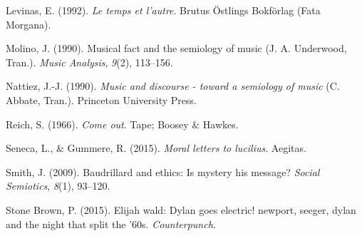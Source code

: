 \documentclass[11pt]{article}
\begin{document}
\begin{hangparas}{1.5em}{1}
\hypertarget{citeproc_bib_item_13}{Levinas, E. (1992). \textit{Le temps et l’autre}. Brutus Östlings Bokförlag (Fata Morgana).}

\hypertarget{citeproc_bib_item_14}{Molino, J. (1990). Musical fact and the semiology of music (J. A. Underwood, Tran.). \textit{Music Analysis}, \textit{9}(2), 113–156.}

\hypertarget{citeproc_bib_item_15}{Nattiez, J.-J. (1990). \textit{Music and discourse - toward a semiology of music} (C. Abbate, Tran.). Princeton University Press.}

\hypertarget{citeproc_bib_item_16}{Reich, S. (1966). \textit{Come out}. Tape; Boosey \& Hawkes.}

\hypertarget{citeproc_bib_item_17}{Seneca, L., \& Gummere, R. (2015). \textit{Moral letters to lucilius}. Aegitas.}

\hypertarget{citeproc_bib_item_18}{Smith, J. (2009). Baudrillard and ethics: Is mystery his message? \textit{Social Semiotics}, \textit{8}(1), 93–120.}

\hypertarget{citeproc_bib_item_19}{Stone Brown, P. (2015). Elijah wald: Dylan goes electric! newport, seeger, dylan and the night that split the ’60s. \textit{Counterpunch}.}\bigskip
\end{hangparas}
\end{document}
